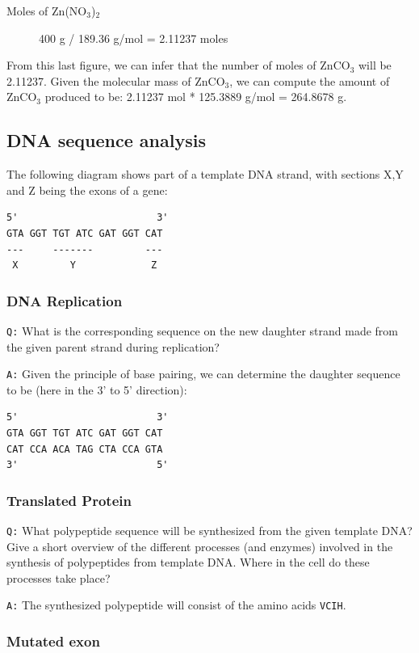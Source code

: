 \documentclass[11pt, a4paper,titlepage]{article}
\begin{document}
\begin{description}
\item[Moles of Zn(NO$_{3}$)$_{2}$] 400 g / 189.36 g/mol = 2.11237 moles
\end{description}

From this last figure, we can infer that the number of moles of
ZnCO$_{3}$ will be 2.11237. Given the molecular mass of ZnCO$_{3}$, we can
compute the amount of ZnCO$_{3}$ produced to be: 2.11237 mol * 125.3889
g/mol = 264.8678 g.
\subsection{DNA sequence analysis}
\label{sec-1-2}


The following diagram shows part of a template DNA strand, with
sections X,Y and Z being the exons of a gene:


\begin{verbatim}
5'                        3'
GTA GGT TGT ATC GAT GGT CAT
---     -------         ---
 X         Y             Z
\end{verbatim}
\subsubsection{DNA Replication}
\label{sec-1-2-1}

\texttt{Q:} What is the corresponding sequence on the new daughter strand
made from the given parent strand during replication?

\texttt{A:} Given the principle of base pairing, we can determine the daughter
sequence to be (here in the 3' to 5' direction):


\begin{verbatim}
5'                        3'
GTA GGT TGT ATC GAT GGT CAT
CAT CCA ACA TAG CTA CCA GTA
3'                        5'
\end{verbatim}
\subsubsection{Translated Protein}
\label{sec-1-2-2}

\texttt{Q:} What polypeptide sequence will be synthesized from the given template
DNA? Give a short overview of the different processes (and enzymes)
involved in the synthesis of polypeptides from template DNA. Where in
the cell do these processes take place?

\texttt{A:} The synthesized polypeptide will consist of the amino acids \texttt{VCIH}. 
\subsubsection{Mutated exon}
\label{sec-1-2-3}
\end{document}
